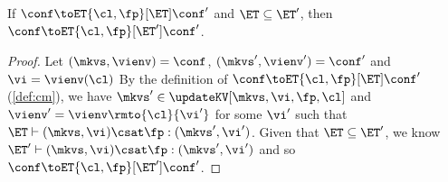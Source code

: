 \begin{lemma}
\label{lem:mono-et}
If $\conf \toET{\cl, \fp}[\ET] \conf'$ and $\ET \subseteq \ET'$, 
then $\conf \toET{\cl, \fp}[\ET'] \conf'$.
\end{lemma}
\begin{proof}
    Let \((\mkvs, \vienv)  = \conf \), \( (\mkvs', \vienv') = \conf' \) and \( \vi  =\vienv(\cl) \)
    By the definition of  $\conf \toET{\cl, \fp}[\ET] \conf'$ (\cref{def:cm}), we have \(\mkvs' \in \updateKV[\mkvs, \vi, \fp, \cl]\) and  \( \vienv' = \vienv\rmto{\cl}{\vi'} \) for some \( \vi' \) such that \( \ET \vdash (\mkvs, \vi) \csat \fp : (\mkvs',\vi') \).
    Given that \( \ET \subseteq \ET'\), we know \( \ET' \vdash (\mkvs, \vi) \csat \fp : (\mkvs',\vi') \) and so $\conf \toET{\cl, \fp}[\ET'] \conf'$.
\end{proof}

